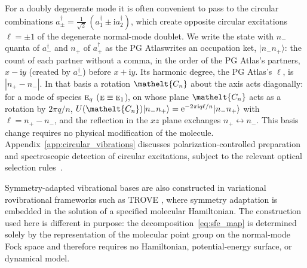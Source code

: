 \documentclass[
  reprint,
  aps,
  prx,
  superscriptaddress,
  amsmath,
  amssymb,
  longbibliography
]{revtex4-2}
\newcommand{\eltfont}[1]{{\let\sigma\eltsigma\mathelt{#1}}}
\newcommand{\irr}[1]{\text{\normalfont\scshape #1}}
\newcommand{\elt}[1]{\eltfont{#1}}
\newcommand{\iunit}{\mathrm{i}}
\newcommand{\expe}{\mathrm{e}}
\newcommand{\occ}[1]{\lvert #1\rangle}
\DeclareRobustCommand{\pgatlasfont}[1]{{\fontencoding{OT1}\fontfamily{cmss}\fontshape{n}\selectfont#1}}
\newcommand{\PGAtlas}{\pgatlasfont{PG Atlas}}
\begin{document}
For a doubly degenerate mode it is often convenient to pass to the circular combinations $a^\dagger_{\pm}=\tfrac{1}{\sqrt{2}}\,(a^\dagger_{1}\pm\iunit a^\dagger_{2})$, which create opposite circular excitations $\ell=\pm1$ of the degenerate normal-mode doublet. We write the state with $n_-$ quanta of $a^\dagger_-$ and $n_+$ of $a^\dagger_+$ as the \PGAtlas writes an occupation ket, $\occ{n_- n_+}$: the count of each partner without a comma, in the order of the \PGAtlas's partners, $x-\iunit y$ (created by $a^\dagger_-$) before $x+\iunit y$. Its harmonic degree, the \PGAtlas's $\ell$, is $|n_+-n_-|$.
In that basis a rotation $\elt{C_{\mathnormal{n}}}$ about the axis acts diagonally: for a mode of species $\irr{e}_{q}$ ($\irr{e}\equiv\irr{e}_{1}$), on whose plane $\elt{C_{\mathnormal{n}}}$ acts as a rotation by $2\pi q/n$, $U(\elt{C_{\mathnormal{n}}})\occ{n_- n_+}=\expe^{-2\pi\iunit q\ell/n}\occ{n_- n_+}$ with $\ell=n_+-n_-$, and the reflection in the $xz$ plane exchanges $n_+\leftrightarrow n_-$. This basis change requires no physical modification of the molecule. Appendix~\ref{app:circular_vibrations} discusses polarization-controlled preparation and spectroscopic detection of circular excitations, subject to the relevant optical selection rules~\cite{Lin2025}. 

Symmetry-adapted vibrational bases are also constructed in variational rovibrational frameworks such as TROVE \cite{Yurchenko_2017, Chubb2018}, where symmetry adaptation is embedded in the solution of a specified molecular Hamiltonian. The construction used here is different in purpose: the decomposition~\eqref{eq:sfe_map} is determined solely by the representation of the molecular point group on the normal-mode Fock space and therefore requires no Hamiltonian, potential-energy surface, or dynamical model.
\end{document}
